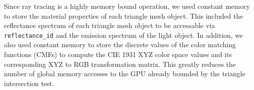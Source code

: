 \documentclass[../main.tex]{subfiles}
\begin{document}
Since ray tracing is a highly memory bound operation, we used constant memory to store
the material properties of each triangle mesh object. This included the reflectance spectrum
of each triangle mesh object to be accessable via \texttt{reflectance\_id} and the emission spectrum
of the light object. In addition, we also used constant memory to store the discrete values of
the color matching functions (CMFs) to compute the CIE 1931 XYZ color space values and its
corresponding XYZ to RGB transformation matrix. This greatly reduces the number of
global memory accesses to the GPU already bounded by the triangle intersection test.

\ifSubfilesClassLoaded{%
    \nocite{*}
    \twocolumn
}{}
\end{document}
